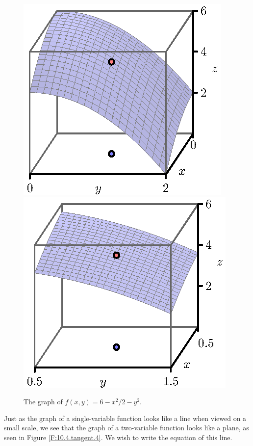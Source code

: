 \begin{pa}
  \begin{figure}[ht]
    \begin{center}
      \includegraphics{figures/fig_10_4_tangent_2.eps}
      \hspace*{20pt}
      \includegraphics{figures/fig_10_4_tangent_3.eps}
    \end{center}
    \caption{The graph of $f(x,y)=6-x^2/2 - y^2$.}
    \label{F:10.4.tangent.2}
  \end{figure}

  Just as the graph of a single-variable function looks like a line
  when viewed on a small scale, we see that the graph of a
  two-variable function looks like a plane, as seen in Figure
  \ref{F:10.4.tangent.4}.  We wish to write the equation of this
  line. 


\end{pa}
